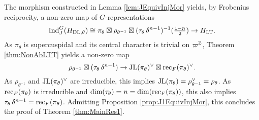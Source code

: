 \documentclass[../main.tex]{subfiles}
\begin{document}
The morphism constructed in Lemma \ref{lem:JEquivInjMor} yields, by Frobenius
reciprocity, a non-zero map of $G$-representations
\begin{equation} \label{eq:WantedMap}
  \mathrm{Ind}_{J}^G (H_{\mathrm{DL},\theta}) \cong \pi_\theta \boxtimes \rho_{\theta^{-1}}
  \boxtimes (\tau_\theta \, \delta^{n-1})^{-1}(\tfrac{1-n}2) \to H_{\mathrm{LT}}.
\end{equation}
As $\pi_\theta$ is supercuspidal and its central character is trivial on 
$\varpi^{\mathbb{Z}}$, Theorem \ref{thm:NonAbLTT} yields a non-zero map
\begin{equation*}
  \rho_{\theta^{-1}} \boxtimes (\tau_\theta \, \delta^{n-1}) \to
  \mathrm{JL}(\pi_\theta)^\vee \boxtimes \mathrm{rec}_F(\pi_\theta)^\vee.
\end{equation*}
As $\rho_{\theta^{-1}}$ and $\mathrm{JL}(\pi_\theta)^\vee$ are irreducible, this implies
$\mathrm{JL}(\pi_\theta) = \rho_{\theta^{-1}}^\vee = \rho_\theta$. As 
$\mathrm{rec}_F(\pi_\theta)$ is irreducible and $\dim(\tau_\theta) = n = \dim
(\mathrm{rec}_F(\pi_\theta))$, this also implies $\tau_\theta \, \delta^{n-1} =
\mathrm{rec}_F(\pi_\theta)$. Admitting Proposition \ref{prop:J1EquivInjMor}, this
concludes the proof of Theorem \ref{thm:MainRes1}.


\end{document}
